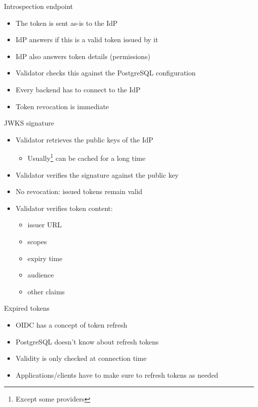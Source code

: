 \documentclass[aspectratio=169]{beamer}
\begin{document}
\begin{frame}{Introspection endpoint}
  \begin{itemize}
    \item The token is sent as-is to the IdP
    \item IdP answers if this is a valid token issued by it
    \item IdP also answers token details (permissions)
    \item Validator checks this against the PostgreSQL configuration
    \item Every backend has to connect to the IdP
    \item Token revocation is immediate
  \end{itemize}
\end{frame}

\begin{frame}{JWKS signature}
  \begin{itemize}
    \item Validator retrieves the public keys of the IdP
    \begin{itemize}
    \item Usually\footnote{Except some providers} can be cached for a long time
    \end{itemize}
    \item Validator verifies the signature against the public key
    \item No revocation: issued tokens remain valid
    \item Validator verifies token content:
    \begin{itemize}
      \item issuer URL
      \item scopes
      \item expiry time
      \item audience
      \item other claims
    \end{itemize}
  \end{itemize}
\end{frame}

\begin{frame}{Expired tokens}
  \begin{itemize}
    \item OIDC has a concept of token refresh
    \item PostgreSQL doesn't know about refresh tokens
    \item Validity is only checked at connection time
    \item Applications/clients have to make sure to refresh tokens as needed
  \end{itemize}
\end{frame}

\thankyouslide
\end{document}
